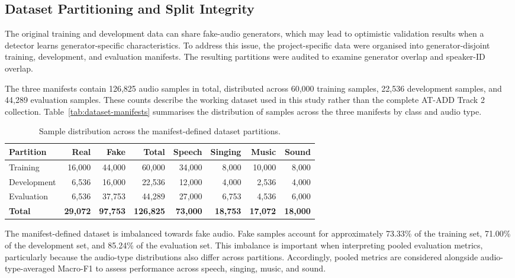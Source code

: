 \subsection{Dataset Partitioning and Split Integrity}
\label{sec:partitioning}
\label{sec:overlap}

The original training and development data can share fake-audio generators, which may lead to optimistic validation results when a detector learns generator-specific characteristics. To address this issue, the project-specific data were organised into generator-disjoint training, development, and evaluation manifests. The resulting partitions were audited to examine generator overlap and speaker-ID overlap.

The three manifests contain 126,825 audio samples in total, distributed across 60,000 training samples, 22,536 development samples, and 44,289 evaluation samples. These counts describe the working dataset used in this study rather than the complete AT-ADD Track 2 collection. Table~\ref{tab:dataset-manifests} summarises the distribution of samples across the three manifests by class and audio type.

\begin{table}[htbp]
\centering
\caption{Sample distribution across the manifest-defined dataset partitions.}
\label{tab:dataset-manifests}
\label{tab:dataset-eval}
\small
\begin{tabular}{@{}lrrrrrrr@{}}
\toprule
Partition & Real & Fake & Total & Speech & Singing & Music & Sound \\
\midrule
Training    & 16{,}000 & 44{,}000 & 60{,}000  & 34{,}000 & 8{,}000 & 10{,}000 & 8{,}000 \\
Development & 6{,}536  & 16{,}000 & 22{,}536  & 12{,}000 & 4{,}000 & 2{,}536  & 4{,}000 \\
Evaluation  & 6{,}536  & 37{,}753 & 44{,}289  & 27{,}000 & 6{,}753 & 4{,}536  & 6{,}000 \\
\midrule
\textbf{Total} & \textbf{29{,}072} & \textbf{97{,}753} & \textbf{126{,}825} & \textbf{73{,}000} & \textbf{18{,}753} & \textbf{17{,}072} & \textbf{18{,}000} \\
\bottomrule
\end{tabular}
\end{table}

The manifest-defined dataset is imbalanced towards fake audio. Fake samples account for approximately 73.33\% of the training set, 71.00\% of the development set, and 85.24\% of the evaluation set. This imbalance is important when interpreting pooled evaluation metrics, particularly because the audio-type distributions also differ across partitions. Accordingly, pooled metrics are considered alongside audio-type-averaged Macro-F1 to assess performance across speech, singing, music, and sound.

